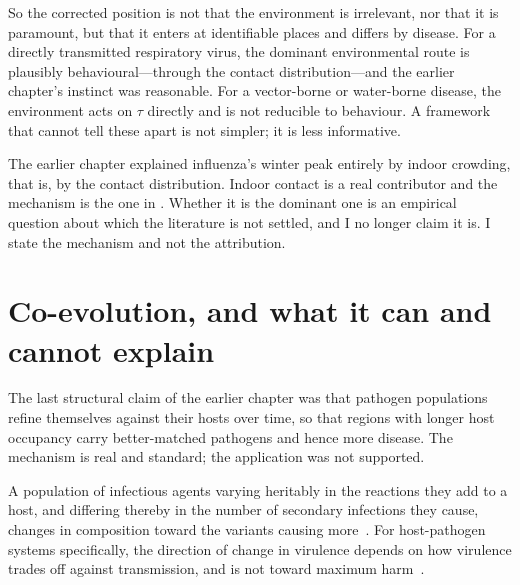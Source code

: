 So the corrected position is not that the environment is irrelevant, nor
that it is paramount, but that it enters at identifiable places and differs
by disease. For a directly transmitted respiratory virus, the dominant
environmental route is plausibly behavioural---through the contact
distribution---and the earlier chapter's instinct was reasonable. For a
vector-borne or water-borne disease, the environment acts on $\tau$ directly
and is not reducible to behaviour. A framework that cannot tell these apart
is not simpler; it is less informative.

\begin{remark}[Seasonality]
\label{sm:rem-seasonality}
The earlier chapter explained influenza's winter peak entirely by indoor
crowding, that is, by the contact distribution. Indoor contact is a real
contributor and the mechanism is the one in
. Whether it is the dominant one is an empirical
question about which the literature is not settled, and I no longer claim it
is. I state the mechanism and not the attribution.
\end{remark}

\section{Co-evolution, and what it can and cannot explain}
\label{sm:sec:coevolution}

The last structural claim of the earlier chapter was that pathogen
populations refine themselves against their hosts over time, so that regions
with longer host occupancy carry better-matched pathogens and hence more
disease. The mechanism is real and standard; the application was not
supported.

\begin{inputstmt}
\label{sm:in-selection}
\lnkS{} A population of infectious agents varying heritably in the
reactions they add to a host, and differing thereby in the number of
secondary infections they cause, changes in composition toward the variants
causing more~\citep{fisher1930genetical,maynard1982evolution}. For
host-pathogen systems specifically, the direction of change in virulence
depends on how virulence trades off against transmission, and is not
toward maximum harm~\citep{anderson1979regulation,ewald1994evolution}.
\end{inputstmt}

